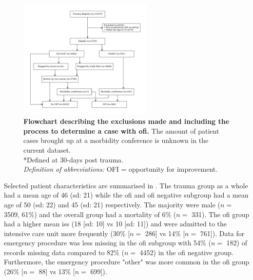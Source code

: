 \documentclass[12pt, a4paper]{article}
\begin{document}
\begin{figure}
    \centering
    \includegraphics[width=0.6\textwidth]{figures/flowchart.pdf}
    \caption{\textbf{Flowchart describing the exclusions made and including the process to determine a case with \acrshort{ofi}.} The amount of patient cases brought up at a morbidity conference is unknown in the current dataset.\\
        *Defined at 30-days post trauma.\\
        \textit{Definition of abbreviations:} OFI = opportunity for improvement.}
    \label{fig:flowchart}
\end{figure}

Selected patient characteristics are summarised in . The trauma group as a whole had a mean age of 46 (\acrshort{sd}: 21) while the \acrshort{ofi} and \acrshort{ofi} negative subgroup had a mean age of 50 (\acrshort{sd}: 22) and 45 (\acrshort{sd}: 21) respectively. The majority were male ($n = $ \num{3509}, 61\%) and the overall group had a mortality of 6\% ($n = $ \num{331}). The \acrshort{ofi} group had a higher mean \acrshort{iss} (18 [\acrshort{sd}: 10] vs 10 [\acrshort{sd}: 11]) and were admitted to the intensive care unit more frequently (30\% [$n = $ \num{286}] vs 14\% [$n = $ \num{761}]). Data for emergency procedure was less missing in the \acrshort{ofi} subgroup with 54\% ($n = $ 182) of records missing data compared to 82\% ($n = $ \num{4452}) in the \acrshort{ofi} negative group. Furthermore, the emergency procedure "other" was more common in the \acrshort{ofi} group (26\% [$n = $ \num{88}] vs 13\% [$n = $ \num{699}]).
\end{document}
